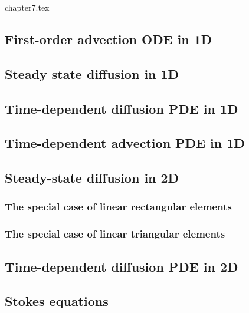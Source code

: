 \begin{flushright} {\tiny {\color{gray} chapter7.tex}} \end{flushright}



\subsection{First-order advection ODE in 1D} 
\subsection{Steady state diffusion in 1D \label{ss:dgss1D}} 
\subsection{Time-dependent diffusion PDE in 1D} 

\newpage
\subsection{Time-dependent advection PDE in 1D \label{ss:dgfem1D_adv}}  %

\newpage
\subsection{Steady-state diffusion in 2D} 
\subsubsection{The special case of linear rectangular elements} 
\subsubsection{The special case of linear triangular elements} 
%

\subsection{Time-dependent diffusion PDE in 2D}

\newpage
\subsection{Stokes equations} 

